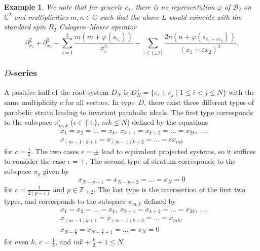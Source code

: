 \documentclass[12pt]{amsart}
\newcommand{\C}{\mathbb C}
\newcommand{\Z}{\mathbb Z}
\numberwithin{equation}{section}
\newtheorem{example}[theorem]{Example}
\theoremstyle{definition}
\begin{document}
\begin{example}
    We note that for generic $c_1$, there is no representation $\varphi$ of $\mathcal{B}_2$ on~$\C^2$ and multiplicities $m,n \in \C$ such that the above $L$ would coincide with the standard spin $B_2$ Calogero--Moser operator
    \begin{equation*}
        \partial_{x_1}^2 + \partial_{x_2}^2 - \sum_{i=1}^2\frac{m(m + \varphi(s_{e_i}))}{x_i^2}
       -\sum_{\varepsilon \in \{\pm 1\}}\frac{2n(n + \varphi(s_{e_1+ \varepsilon e_2}))}{(x_1+ \varepsilon x_2)^2}.
    \end{equation*}
\end{example}

\subsubsection{$D$-series}\label{D series}
A positive half of the root system $D_N$ is $D_N^+ = \{ e_i \pm e_j \mid 1 \leq i < j \leq N\}$ with the same multiplicity $c$ for all vectors.
In type~$D$, there exist three different types of parabolic strata leading to invariant parabolic ideals. The first type corresponds to the subspace $\pi_{m,k}^{\epsilon}$ ($\epsilon \in \{ \pm \}$, $mk \leq N$) defined by the equations
\begin{align*}
    &x_1 = x_2 = \dots = x_k, \ x_{k+1} = x_{k+2} = \dots = x_{2k}, \ \ldots, \\
    &x_{(m-1)k + 1} = x_{(m-1)k + 2} = \dots = \epsilon x_{mk}
\end{align*}
for $c = \frac{1}{k}$. 
The two cases $\epsilon = \pm$ lead to equivalent projected systems, so it suffices to consider the case $\epsilon = +$. 
The second type of stratum corresponds to the subspace $\pi_p$ given by
\begin{equation*}
     x_{N-p+1} = x_{N-p+2} = \dots = x_N = 0
\end{equation*}
for $c = \frac{1}{2(p-1)}$ and $p \in \Z_{\geq 2}$. The last type is the intersection of the first two types, and corresponds to the subspace $\pi_{m,k}$ defined by
\begin{align*}
    &x_1 = x_2 = \dots = x_k, \ x_{k+1} = x_{k+2} = \dots = x_{2k}, \ \ldots, \\
    &x_{(m-1)k+1} = x_{(m-1)k + 2} = \dots = x_{mk}, \\
    &x_{N-\frac{k}{2}} = x_{N-\frac{k}{2}+1} = \dots = x_N = 0
\end{align*}
for even $k$, $c = \frac{1}{k}$, and $mk + \frac{k}{2} + 1 \leq N$. 
\end{document}
